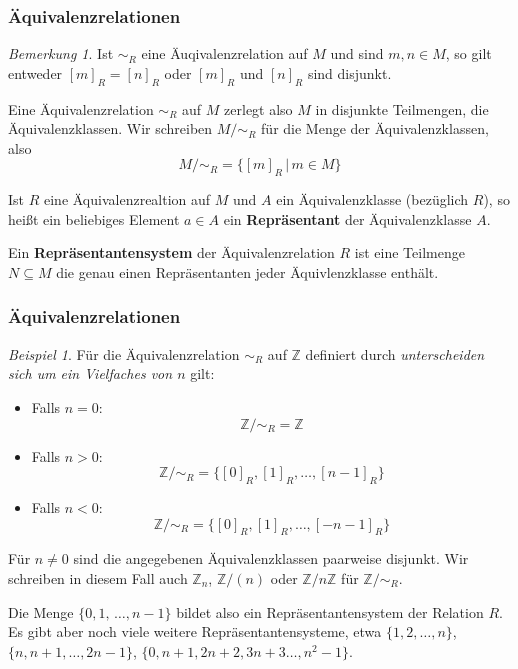 \documentclass[hyperref={pdfpagelabels=false}]{beamer}
\theoremstyle{plain}%
\theoremstyle{definition}
\theoremstyle{remark}
\newtheorem*{beispiel}{Beispiel}
\newtheorem*{notiz}{Bemerkung}
\def \Z{\mathbb Z}
\begin{document}
\begin{frame}
\frametitle{Äquivalenzrelationen}

\begin{notiz} Ist $\sim_R$ eine Äuqivalenzrelation auf $M$ und sind $m, n \in M$, so gilt entweder  
$[m]_R = [n]_R$ oder $[m]_R$ und $[n]_R$ sind disjunkt. 

\pause 
Eine Äquivalenzrelation $\sim_R$ auf $M$ zerlegt also $M$ in disjunkte Teilmengen, die Äquivalenzklassen. 
Wir schreiben $M/\sim_R$ für die Menge der Äquivalenzklassen, also 
  	$$ M/\sim_R = \{ [m]_R\, \vert \, m \in M \} $$
\end{notiz}

\pause 
\begin{definition} Ist $R$ eine Äquivalenzrealtion auf $M$ und $A$ ein Äquivalenzklasse (bezüglich $R$), 
so heißt ein beliebiges Element $a \in A$ ein 
\textbf{Repräsentant} der Äquivalenzklasse $A$.

\pause
Ein \textbf{Repräsentantensystem} der Äquivalenzrelation $R$ ist eine Teilmenge $
N \subseteq M$ die genau einen Repräsentanten jeder Äquivlenzklasse enthält.
\end{definition}

\end{frame}

\begin{frame}
\frametitle{Äquivalenzrelationen}

\begin{beispiel}\label{rela_z_mod_n} 
Für die Äquivalenzrelation $\sim_R$ auf $\Z$ definiert durch 
\textit{unterscheiden sich um ein Vielfaches von $n$}  gilt:
\vspace{-0.1cm}
\begin{itemize}
\item<2-> Falls $n = 0$:
  	$$ \mathbb Z/\sim_R = \mathbb Z$$
\item<3-> Falls $n > 0$: 
  	$$ \mathbb Z/\sim_R = \{ [0]_R, [1]_R, \ldots , [n-1]_R \} $$
\item<4-> Falls $n < 0$:
  	$$ \mathbb Z/\sim_R = \{ [0]_R, [1]_R, \ldots , [-n-1]_R \} $$
\end{itemize}
\vspace{-0.5cm}
\pause \pause \pause \pause 
Für $n \neq 0$ sind die angegebenen Äquivalenzklassen paarweise disjunkt. Wir schreiben in diesem Fall 
auch $\mathbb Z_n$, $\mathbb Z/(n)$ oder $\mathbb Z / n \mathbb Z$ für $\mathbb Z/\sim_R$.

\pause
Die Menge $\{0, 1, \, \ldots , n-1\}$ bildet also ein Repräsentantensystem der Relation $R$. Es gibt aber 
noch viele weitere Repräsentantensysteme, etwa $\{1, 2, \ldots, n \}$, $\{n, n+1, \ldots, 2n-1\}$, 
$\{0, n+ 1, 2n+2, 3n+3 \ldots, n^2-1 \}$.
\end{beispiel}

\end{frame}
\end{document}
